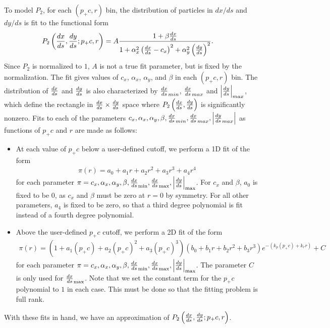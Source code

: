\documentclass[12pt]{article}
\begin{document}
To model $P_2$, for each $(p_+ c, r)$ bin, the distribution of particles in $dx/ds$ and $dy/ds$ is
fit to the functional form
\begin{align}
P_2 \left( \frac{dx}{ds}, \frac{dy}{ds}; p_+ c, r \right) & = A \frac{1 + \beta \frac{dx}{ds}}{1 + \alpha_x^2 \left( \frac{dx}{ds} - c_x \right)^2 + \alpha_y^2 \left( \frac{dy}{ds} \right)^2}. \label{eq:cauchy}
\end{align}
Since $P_2$ is normalized to $1$, $A$ is not a true fit parameter, but is fixed by the
normalization.  The fit gives values of $c_x$, $\alpha_x$, $\alpha_y$, and $\beta$ in each $(p_+ c,
r)$ bin.  The distribution of $\frac{dx}{ds}$ and $\frac{dy}{ds}$ is also characterized by $\frac{dx}{ds}_{min}$,
$\frac{dx}{ds}_{max}$ and $\left| \frac{dy}{ds} \right|_{max}$, which define the rectangle in $\frac{dx}{ds} \times \frac{dy}{ds}$
space where $P_2 \left( \frac{dx}{ds}, \frac{dy}{ds} \right)$ is significantly nonzero.  Fits to each of the
parameters $c_x, \alpha_x, \alpha_y, \beta, \frac{dx}{ds}_{min}, \frac{dx}{ds}_{max}, \left| \frac{dy}{ds}_{max} \right|$ as
functions of $p_+ c$ and $r$ are made as follows:
\begin{itemize}
\item
At each value of $p_+ c$ below a user-defined cutoff, we perform a 1D fit of the form
\begin{align}
\pi(r) = a_0 + a_1 r+ a_2 r^2 + a_3 r^3 + a_4 r^4 \label{eq:fit1}
\end{align}
for each parameter $\pi =c_x, \alpha_x, \alpha_y, \beta, \frac{dx}{ds}_{\mathrm{min}}, \frac{dx}{ds}_{\mathrm{max}}, \left| \frac{dy}{ds} \right|_{\mathrm{max}}$.  For $c_x$
and $\beta$, $a_0$ is fixed to be 0, as $c_x$ and $\beta$ must be zero at $r=0$ by symmetry.  For
all other parameters, $a_4$ is fixed to be zero, so that a third degree polynomial is fit instead of
a fourth degree polynomial.

\item
Above the user-defined $p_+ c$ cutoff, we perform a 2D fit of the form
\begin{align}
\pi(r) = (1 + a_1 (p_+c) + a_2 (p_+c)^2 + a_3 (p_+c)^3)
         (b_0 + b_1 r + b_2 r^2 + b_3 r^3) e^{-(k_p (p_+ c) + k_r r)} + C \label{eq:fit2}
\end{align}
for each parameter $\pi =c_x, \alpha_x, \alpha_y, \beta, \frac{dx}{ds}_{\mathrm{min}}, \frac{dx}{ds}_{\mathrm{max}}, \left| \frac{dy}{ds} \right|_{\mathrm{max}}$.  The
parameter $C$ is only used for $\frac{dx}{ds}_{\mathrm{max}}$.  Note that we set the constant term for the $p_+ c$
polynomial to $1$ in each case.  This must be done so that the fitting problem is full rank.

\end{itemize}
With these fits in hand, we have an approximation of $P_2 \left( \frac{dx}{ds}, \frac{dy}{ds}; p_+ c, r \right)$.
\end{document}
